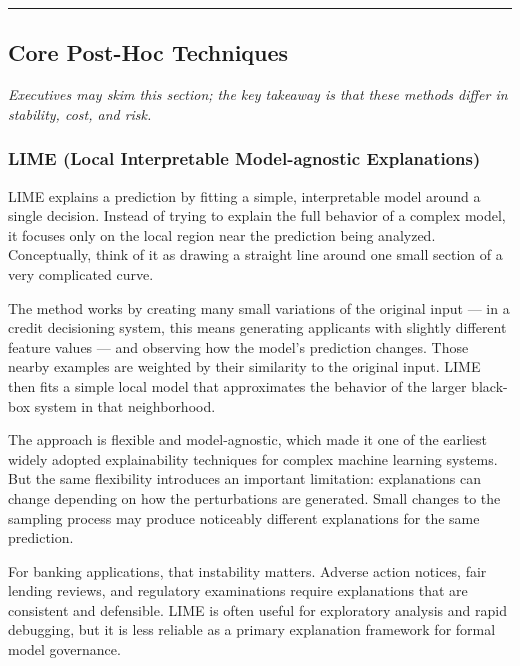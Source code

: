 \documentclass[
  letterpaper,
  DIV=11,
  numbers=noendperiod]{scrartcl}
\begin{document}
\begin{center}\rule{0.5\linewidth}{0.5pt}\end{center}

\subsection{Core Post-Hoc Techniques}\label{core-post-hoc-techniques}

\emph{Executives may skim this section; the key takeaway is that these
methods differ in stability, cost, and risk.}

\subsubsection{LIME (Local Interpretable Model-agnostic
Explanations)}\label{lime-local-interpretable-model-agnostic-explanations}

LIME explains a prediction by fitting a simple, interpretable model
around a single decision. Instead of trying to explain the full behavior
of a complex model, it focuses only on the local region near the
prediction being analyzed. Conceptually, think of it as drawing a
straight line around one small section of a very complicated curve.

The method works by creating many small variations of the original input
--- in a credit decisioning system, this means generating applicants
with slightly different feature values --- and observing how the model's
prediction changes. Those nearby examples are weighted by their
similarity to the original input. LIME then fits a simple local model
that approximates the behavior of the larger black-box system in that
neighborhood.

The approach is flexible and model-agnostic, which made it one of the
earliest widely adopted explainability techniques for complex machine
learning systems. But the same flexibility introduces an important
limitation: explanations can change depending on how the perturbations
are generated. Small changes to the sampling process may produce
noticeably different explanations for the same prediction.

For banking applications, that instability matters. Adverse action
notices, fair lending reviews, and regulatory examinations require
explanations that are consistent and defensible. LIME is often useful
for exploratory analysis and rapid debugging, but it is less reliable as
a primary explanation framework for formal model governance.
\end{document}
